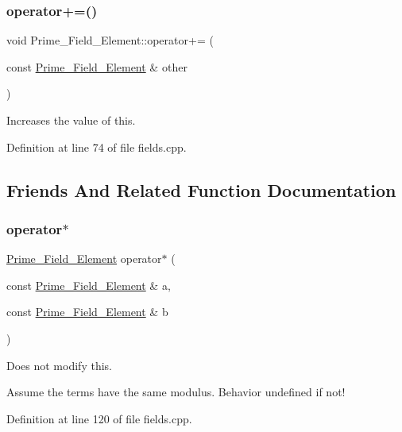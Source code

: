 \subsubsection{\texorpdfstring{operator+=()}{operator+=()}}
{\footnotesize\ttfamily void Prime\+\_\+\+Field\+\_\+\+Element\+::operator+= (\begin{DoxyParamCaption}\item[{const \hyperlink{class_prime___field___element}{Prime\+\_\+\+Field\+\_\+\+Element} \&}]{other }\end{DoxyParamCaption})}

Increases the value of {\ttfamily this}. 

Definition at line 74 of file fields.\+cpp.



\subsection{Friends And Related Function Documentation}
\mbox{\label{class_prime___field___element_a33507738ef00abb43ae64c900f7b807a}} 
\subsubsection{\texorpdfstring{operator$\ast$}{operator*}}
{\footnotesize\ttfamily \hyperlink{class_prime___field___element}{Prime\+\_\+\+Field\+\_\+\+Element} operator$\ast$ (\begin{DoxyParamCaption}\item[{const \hyperlink{class_prime___field___element}{Prime\+\_\+\+Field\+\_\+\+Element} \&}]{a,  }\item[{const \hyperlink{class_prime___field___element}{Prime\+\_\+\+Field\+\_\+\+Element} \&}]{b }\end{DoxyParamCaption})\hspace{0.3cm}{\ttfamily [friend]}}



Does not modify {\ttfamily this}. 

Assume the terms have the same modulus. Behavior undefined if not! 

Definition at line 120 of file fields.\+cpp.

\mbox{\label{class_prime___field___element_af379d31756ccc09650e204aaa7dc1dd2}} 
